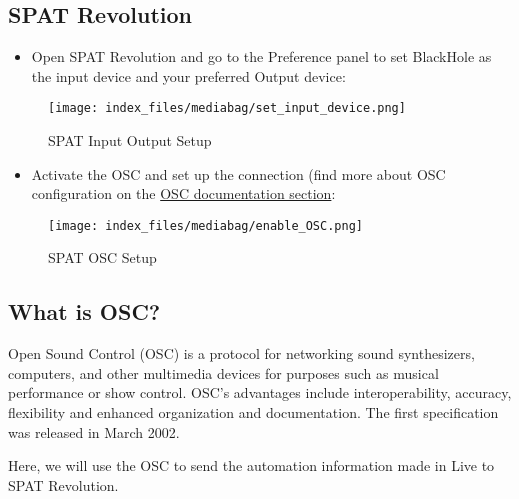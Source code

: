 \documentclass[
  letterpaper,
  DIV=11,
  numbers=noendperiod]{scrreport}
\providecommand{\tightlist}{%
  \setlength{\itemsep}{0pt}\setlength{\parskip}{0pt}}\usepackage{longtable,booktabs,array}
\begin{document}
\hypertarget{spat-revolution}{%
\subsection{SPAT Revolution}\label{spat-revolution}}

\begin{itemize}
\tightlist
\item
  Open SPAT Revolution and go to the Preference panel to set BlackHole
  as the input device and your preferred Output device:
\end{itemize}

\begin{figure}

{\centering \texttt{[image: index\_files/mediabag/set\_input\_device.png]}

}

\caption{SPAT Input Output Setup}

\end{figure}

\begin{itemize}
\tightlist
\item
  Activate the OSC and set up the connection (find more about OSC
  configuration on the
  \href{Ecosystem_\&_integration_OSC_Connections_Matrix.md}{OSC
  documentation section}:
\end{itemize}

\begin{figure}

{\centering \texttt{[image: index\_files/mediabag/enable\_OSC.png]}

}

\caption{SPAT OSC Setup}

\end{figure}

\hypertarget{what-is-osc}{%
\subsection{What is OSC?}\label{what-is-osc}}

Open Sound Control (OSC) is a protocol for networking sound
synthesizers, computers, and other multimedia devices for purposes such
as musical performance or show control. OSC's advantages include
interoperability, accuracy, flexibility and enhanced organization and
documentation. The first specification was released in March 2002.

Here, we will use the OSC to send the automation information made in
Live to SPAT Revolution.
\end{document}
